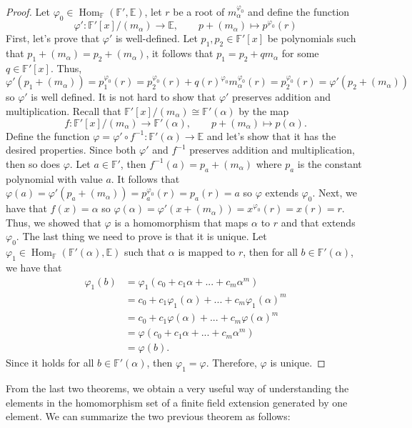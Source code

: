 \documentclass{article}
\theoremstyle{plain}
\theoremstyle{definition}
\newcommand{\F}{\mathbb{F}}
\newcommand{\E}{\mathbb{E}}
\DeclareMathOperator{\Hom}{Hom}
\newcommand{\isomorphic}{\cong}
\begin{document}
\begin{proof}
    Let $\varphi_0 \in \Hom_{\F}(\F', \E)$, let $r$ be a root of $m_{\alpha}^{\varphi_0}$ and define the function 
    $$\varphi' : \F'[x]/(m_{\alpha}) \to \E, \qquad p+(m_{\alpha}) \mapsto p^{\varphi_0}(r)$$ First, let's prove that $\varphi'$ is well-defined. Let $p_1, p_2 \in \F'[x]$ be polynomials such that $p_1 + (m_{\alpha}) = p_2 + (m_{\alpha})$, it follows that $p_1 = p_2 + q m_{\alpha}$ for some $q \in \F'[x]$. Thus,
    $$\varphi'(p_1 + (m_{\alpha})) = p_1^{\varphi_0}(r) = p_2^{\varphi_0}(r) + q(r)^{\varphi_0}m_{\alpha}^{\varphi_0}(r) = p_2^{\varphi_0}(r) = \varphi'(p_2 + (m_{\alpha}))$$
    so $\varphi'$ is well defined. It is not hard to show that $\varphi'$ preserves addition and multiplication. Recall that $\F'[x]/(m_{\alpha}) \isomorphic \F'(\alpha)$ by the map
    $$f : \F'[x]/(m_{\alpha}) \to \F'(\alpha), \qquad p + (m_{\alpha}) \mapsto p(\alpha).$$ Define the function $\varphi = \varphi' \circ f^{-1} : \F'(\alpha) \to \E$ and let's show that it has the desired properties. Since both $\varphi'$ and $f^{-1}$ preserves addition and multiplication, then so does $\varphi$. Let $a \in \F'$, then $f^{-1}(a) = p_a + (m_{\alpha})$ where $p_a$ is the constant polynomial with value $a$. It follows that $\varphi(a) = \varphi'(p_a + (m_{\alpha})) = p_a^{\varphi_0}(r) = p_a(r) = a$ so $\varphi$ extends $\varphi_0$. Next, we have that $f(x) = \alpha$ so $\varphi(\alpha) = \varphi'(x + (m_{\alpha})) = x^{\varphi_0}(r) = x(r) = r.$ Thus, we showed that $\varphi$ is a homomorphism that maps $\alpha$ to $r$ and that extends $\varphi_0$. The last thing we need to prove is that it is unique. Let $\varphi_1 \in \Hom_{\F}(\F'(\alpha), \E)$ such that $\alpha$ is mapped to $r$, then for all $b \in \F'(\alpha)$, we have that
    \begin{align*}
        \varphi_1(b) &= \varphi_1(c_0 + c_1 \alpha + ... + c_m \alpha^m) \\
        &= c_0 + c_1 \varphi_1(\alpha) + ... + c_m \varphi_1(\alpha)^m \\
        &= c_0 + c_1 \varphi(\alpha) + ... + c_m \varphi(\alpha)^m \\
        &= \varphi(c_0 + c_1 \alpha + ... + c_m \alpha^m) \\
        &= \varphi(b).
    \end{align*}
    Since it holds for all $b \in \F'(\alpha)$, then $\varphi_1 = \varphi$. Therefore, $\varphi$ is unique. 
\end{proof}

From the last two theorems, we obtain a very useful way of understanding the elements in the homomorphism set of a finite field extension generated by one element. We can summarize the two previous theorem as follows:
\end{document}

